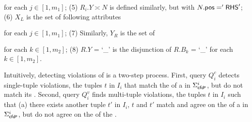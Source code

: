 \begin{footnotesize}
\end{footnotesize}

\noindent for each $j\in[1, m_1]$; (5) $R_i.Y\asymp N$ is defined similarly, but with $N.\protect\mathsf{pos}='{\mathsf{RHS}}'$; (6) $X_{L}$ is the set of following attributes

\begin{footnotesize}
\end{footnotesize}
\noindent for each $j \in [1, m_1]$; (7) Similarly, $Y_{R}$ is the set of
\begin{footnotesize}
\end{footnotesize}
\noindent for each $k \in [1, m_2]$; (8) $R.Y$ = `\_' is the disjunction of $R.B_k$ = `\_' for each $k \in [1, m_2]$.

Intuitively, detecting violations of \pCFDs is a two-step process. First, query $Q_{i}^{c}$ detects single-tuple violations, \ie the tuples $t$ in $I_{i}$ that match the \LHS of a \pCFD in $\Sigma_{{\mathsf{cfd^p}}}^i$, but do not match its \RHS. Second, query $Q_{i}^{v}$ finds multi-tuple violations, \ie the tuples $t$ in $I_{i}$ such that (a) there exists another tuple $t'$ in $I_{i}$, $t$ and $t'$ match and agree on the \LHS of a \pCFD in $\Sigma_{{\mathsf{cfd^p}}}^i$, but do not agree on the \RHS of the \pCFD.



